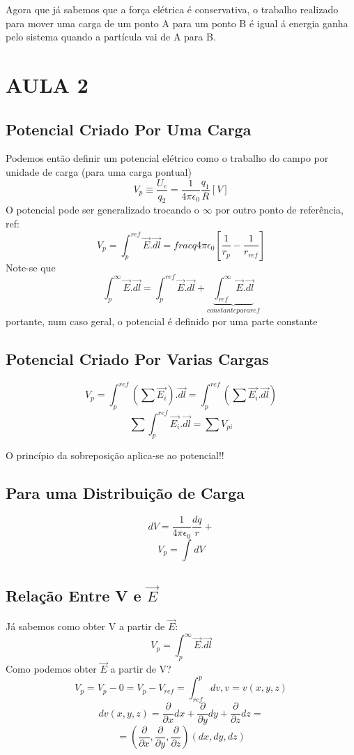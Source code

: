 \documentclass[a4paper]{article}
\begin{document}
Agora que já sabemos que a força elétrica é conservativa, o trabalho realizado para mover uma carga 
de um ponto A para um ponto B é igual á energia ganha pelo sistema quando a partícula vai de A para B.

\section{AULA 2}

\subsection{Potencial Criado Por Uma Carga}

Podemos então definir um potencial elétrico como o trabalho do campo por unidade de carga (para uma carga pontual)
\[V_p \equiv  \frac{U_e}{q_2} = \frac{1}{4\pi\epsilon_0} \frac{q_1}{R}  \left[V\right]\]
O potencial pode ser generalizado trocando o $\infty$ por outro ponto de referência, ref:
\[V_p = \int_{p}^{ref}\vec{E}.\vec{dl}= frac{q}{4\pi\epsilon_0}\left[\frac{1}{r_p}-\frac{1}{r_{ref}}\right]\]
Note-se que
\[\int_{p}^{\infty}\vec{E}.\vec{dl}= \int_{p}^{ref}\vec{E}.\vec{dl} + \underbrace{\int_{ref}^{\infty}\vec{E}.\vec{dl}}_{constante para ref}\]
portante, num caso geral, o potencial é definido por uma parte constante

\subsection{Potencial Criado Por Varias Cargas}

\[V_p = \int_{p}^{ref}\left(\sum\vec{E_i}\right).\vec{dl} = \int_{p}^{ref}\left(\sum\vec{E_i}.\vec{dl}\right)\]
\[\sum\int_{p}^{ref}\vec{E_i}.\vec{dl} = \sum V_{pi}\]

O princípio da sobreposição aplica-se ao potencial!!

\subsection{Para uma Distribuição de Carga}
\[dV = \frac{1}{4\pi\epsilon_0} \frac{dq}{r} +\]
\[V_p = \int_{}^{} dV \]

\subsection{Relação Entre V e \texorpdfstring{$\vec{E}$}{E}}
Já sabemos como obter V a partir de $\vec{E}$:
\[V_p = \int_{p}^{\infty}\vec{E}.\vec{dl}\]
Como podemos obter $\vec{E}$ a partir de V\@?
\[V_p = V_p-0 = V_p-V_{ref}= \int_{ref}^{p}dv, v= v \left(x,y,z\right)\]
\[dv\left(x,y,z\right) = \frac{\partial}{\partial x}dx + \frac{\partial}{\partial y}dy +\frac{\partial}{\partial z}dz =\]
\[=\left(\frac{\partial}{\partial x},\frac{\partial}{\partial y},\frac{\partial}{\partial z}\right)\left(dx,dy,dz\right)\]
\end{document}
